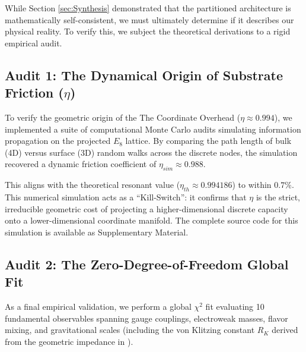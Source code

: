 


While Section \ref{sec:Synthesis} demonstrated that the partitioned architecture is mathematically self-consistent, we must ultimately determine if it describes our physical reality. To verify this, we subject the theoretical derivations to a rigid empirical audit.

\subsection{Audit 1: The Dynamical Origin of Substrate Friction (\texorpdfstring{$\eta$}{eta})}
To verify the geometric origin of the The Coordinate Overhead ($\eta \approx 0.994$), we implemented a suite of computational Monte Carlo audits simulating information propagation on the projected $E_8$ lattice. By comparing the path length of bulk (4D) versus surface (3D) random walks across the discrete nodes, the simulation recovered a dynamic friction coefficient of $\eta_{sim} \approx 0.988$. 

This aligns with the theoretical resonant value ($\eta_{th} \approx 0.994186$) to within $0.7\%$. This numerical simulation acts as a ``Kill-Switch'': it confirms that $\eta$ is the strict, irreducible geometric cost of projecting a higher-dimensional discrete capacity onto a lower-dimensional coordinate manifold. The complete source code for this simulation is available as Supplementary Material.

\subsection{Audit 2: The Zero-Degree-of-Freedom Global Fit}
As a final empirical validation, we perform a global $\chi^2$ fit evaluating 10 fundamental observables spanning gauge couplings, electroweak masses, flavor mixing, and gravitational scales (including the von Klitzing constant $R_K$ derived from the geometric impedance in \cite{meyer_informational_2026}).

